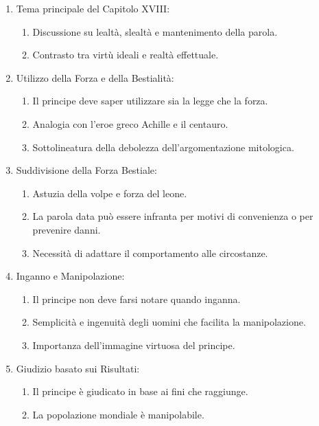 \documentclass{article}
\begin{document}
\begin{enumerate}[label*=\arabic*.]
    \item Tema principale del Capitolo XVIII:
    \begin{enumerate}[label*=\alph*.]
        \item Discussione su lealtà, slealtà e mantenimento della parola.
        \item Contrasto tra virtù ideali e realtà effettuale.
    \end{enumerate}
    
    \item Utilizzo della Forza e della Bestialità:
    \begin{enumerate}[label*=\alph*.]
        \item Il principe deve saper utilizzare sia la legge che la forza.
        \item Analogia con l'eroe greco Achille e il centauro.
        \item Sottolineatura della debolezza dell'argomentazione mitologica.
    \end{enumerate}
    
    \item Suddivisione della Forza Bestiale:
    \begin{enumerate}[label*=\alph*.]
        \item Astuzia della volpe e forza del leone.
        \item La parola data può essere infranta per motivi di convenienza o per prevenire danni.
        \item Necessità di adattare il comportamento alle circostanze.
    \end{enumerate}
    
    \item Inganno e Manipolazione:
    \begin{enumerate}[label*=\alph*.]
        \item Il principe non deve farsi notare quando inganna.
        \item Semplicità e ingenuità degli uomini che facilita la manipolazione.
        \item Importanza dell'immagine virtuosa del principe.
    \end{enumerate}
    
    \item Giudizio basato sui Risultati:
    \begin{enumerate}[label*=\alph*.]
        \item Il principe è giudicato in base ai fini che raggiunge.
        \item La popolazione mondiale è manipolabile.
    \end{enumerate}
\end{enumerate}
\end{document}
